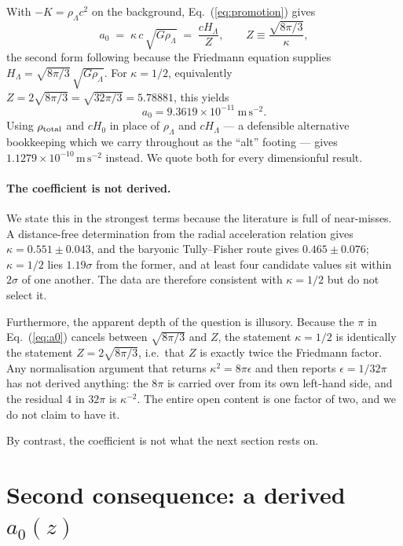 \documentclass[aps,prd,twocolumn,superscriptaddress,nofootinbib,floatfix]{revtex4-2}
\newcommand{\azero}{a_{0}}
\begin{document}
With $-K = \rho_{\Lambda}c^{2}$ on the background, Eq.~(\ref{eq:promotion}) gives
\begin{equation}
  \azero \;=\; \kappa\, c\, \sqrt{G \rho_{\Lambda}} \;=\; \frac{c H_{\Lambda}}{Z},
  \qquad Z \equiv \frac{\sqrt{8\pi/3}}{\kappa},
  \label{eq:a0}
\end{equation}
the second form following because the Friedmann equation supplies $H_{\Lambda} =
\sqrt{8\pi/3}\,\sqrt{G\rho_{\Lambda}}$. For $\kappa = 1/2$, equivalently $Z = 2\sqrt{8\pi/3} =
\sqrt{32\pi/3} = 5.78881$, this yields
\begin{equation}
  \azero = 9.3619\times 10^{-11}\ \mathrm{m\,s^{-2}} .
\end{equation}
Using $\rho_{\rm total}$ and $cH_{0}$ in place of $\rho_{\Lambda}$ and $cH_{\Lambda}$ --- a
defensible alternative bookkeeping which we carry throughout as the ``alt'' footing --- gives
$1.1279\times10^{-10}\,\mathrm{m\,s^{-2}}$ instead. We quote both for every dimensionful result.

\paragraph*{The coefficient is not derived.} We state this in the strongest terms because the
literature is full of near-misses. A distance-free determination from the radial acceleration
relation gives $\kappa = 0.551 \pm 0.043$, and the baryonic Tully--Fisher route gives $0.465 \pm
0.076$; $\kappa = 1/2$ lies $1.19\sigma$ from the former, and at least four candidate values sit
within $2\sigma$ of one another. The data are therefore consistent with $\kappa = 1/2$ but do not
select it.

Furthermore, the apparent depth of the question is illusory. Because the $\pi$ in
Eq.~(\ref{eq:a0}) cancels between $\sqrt{8\pi/3}$ and $Z$, the statement $\kappa = 1/2$ is
identically the statement $Z = 2\sqrt{8\pi/3}$, i.e.\ that $Z$ is exactly twice the Friedmann
factor. Any normalisation argument that returns $\kappa^{2} = 8\pi\epsilon$ and then reports
$\epsilon = 1/32\pi$ has not derived anything: the $8\pi$ is carried over from its own left-hand
side, and the residual $4$ in $32\pi$ is $\kappa^{-2}$. The entire open content is one factor of
two, and we do not claim to have it.

By contrast, the coefficient is not what the next section rests on.

\section{Second consequence: a derived $\azero(z)$}
\label{sec:evolution}
\end{document}
